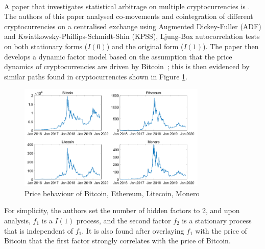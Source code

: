 \\[3mm]
A paper that investigates statistical arbitrage on multiple cryptocurrencies is \cite{Figa-TalamancaGianna2021Cdff}. The authors of this paper analysed co-movements and cointegration of different cryptocurrencies on a centralised exchange using Augmented Dickey-Fuller (ADF) and  Kwiatkowsky-Phillips-Schmidt-Shin (KPSS), Ljung-Box autocorrelation tests on both stationary forms ($I(0)$) and the original form ($I(1)$). The paper then develops a dynamic factor model based on the assumption that the price dynamics of cryptocurrencies are driven by Bitcoin~\cite{blau2020comovement}; this is then evidenced by similar paths found in cryptocurrencies shown in Figure \ref{fig:pricebehaviour}.
\begin{figure}[h!]
    \centering
    \includegraphics[width=0.8\textwidth]{background/Images/price_behaviour.png}
    \caption{Price behaviour of Bitcoin, Ethereum, Litecoin, Monero~\cite{Figa-TalamancaGianna2021Cdff}}
    \label{fig:pricebehaviour}
\end{figure}

\noindent For simplicity, the authors set the number of hidden factors to 2, and upon analysis, $f_1$ is a $I(1)$ process, and the second factor $f_2$ is a stationary process that is independent of $f_1$. It is also found after overlaying $f_1$ with the price of Bitcoin that the first factor strongly correlates with the price of Bitcoin.


